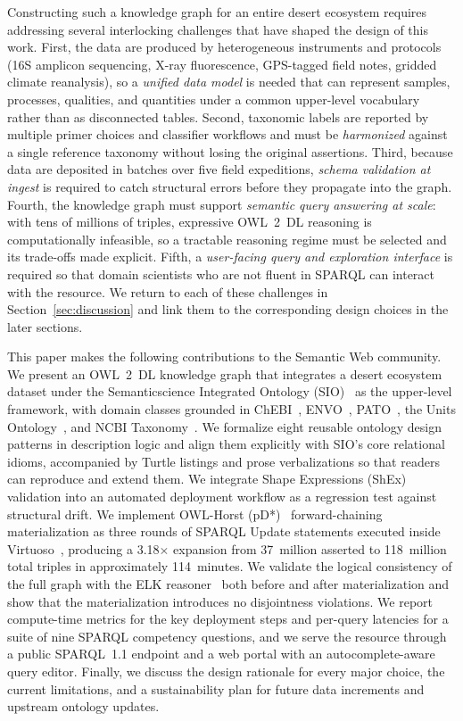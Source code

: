 \documentclass[11pt,a4paper]{article}
\begin{document}
Constructing such a knowledge graph for an entire desert ecosystem
requires addressing several interlocking challenges that have shaped
the design of this work. First, the data are produced by heterogeneous
instruments and protocols (16S amplicon sequencing, X-ray fluorescence,
GPS-tagged field notes, gridded climate reanalysis), so a
\emph{unified data model} is needed that can represent samples,
processes, qualities, and quantities under a common upper-level
vocabulary rather than as disconnected tables. Second, taxonomic
labels are reported by multiple primer choices and classifier
workflows and must be \emph{harmonized} against a single reference
taxonomy without losing the original assertions. Third, because data
are deposited in batches over five field expeditions, \emph{schema
validation at ingest} is required to catch structural errors before
they propagate into the graph. Fourth, the knowledge graph must
support \emph{semantic query answering at scale}: with tens of
millions of triples, expressive OWL~2~DL reasoning is computationally
infeasible, so a tractable reasoning regime must be selected and its
trade-offs made explicit. Fifth, a \emph{user-facing query and
exploration interface} is required so that domain scientists who are
not fluent in SPARQL can interact with the resource. We return to
each of these challenges in Section~\ref{sec:discussion} and link
them to the corresponding design choices in the later sections.

This paper makes the following contributions to the Semantic Web
community. We present an OWL~2~DL knowledge graph that integrates a
desert ecosystem dataset under the Semanticscience Integrated
Ontology (SIO)~\cite{sio} as the upper-level framework, with domain
classes grounded in ChEBI~\cite{chebi}, ENVO~\cite{envo},
PATO~\cite{pato}, the Units Ontology~\cite{uo}, and NCBI
Taxonomy~\cite{ncbitaxon}. We formalize eight reusable ontology
design patterns in description logic and align them explicitly with
SIO's core relational idioms, accompanied by Turtle listings and
prose verbalizations so that readers can reproduce and extend
them. We integrate Shape Expressions (ShEx)~\cite{shex} validation
into an automated deployment workflow as a regression test against
structural drift. We implement OWL-Horst (pD*)~\cite{owlhorst}
forward-chaining materialization as three rounds of SPARQL Update
statements executed inside Virtuoso~\cite{virtuoso}, producing a
3.18$\times$ expansion from 37~million asserted to 118~million
total triples in approximately 114~minutes. We validate the logical
consistency of the full graph with the ELK reasoner~\cite{elk}
both before and after materialization and show that the
materialization introduces no disjointness violations. We report
compute-time metrics for the key deployment steps and per-query
latencies for a suite of nine SPARQL competency questions, and we
serve the resource through a public SPARQL~1.1 endpoint and a web
portal with an autocomplete-aware query editor. Finally, we discuss
the design rationale for every major choice, the current
limitations, and a sustainability plan for future data increments
and upstream ontology updates.
\end{document}
